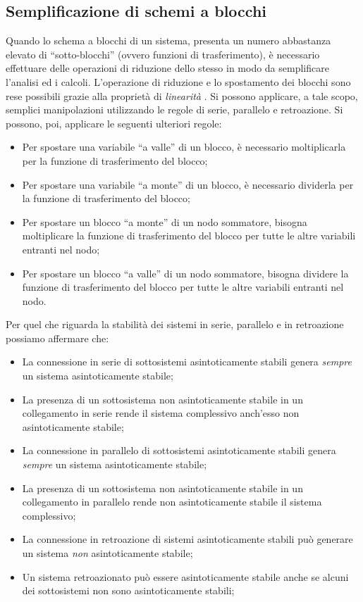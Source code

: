 \documentclass[a4paper]{report}
\begin{document}
\subsection{Semplificazione di schemi a blocchi}
Quando lo schema a blocchi  di un sistema, presenta un numero
abbastanza elevato di ``sotto-blocchi'' (ovvero funzioni di
trasferimento), \`e necessario effettuare delle operazioni di riduzione
dello stesso in modo da semplificare l'analisi ed i calcoli. L'operazione
di riduzione e lo spostamento dei blocchi sono rese possibili grazie
alla propriet\`a di \emph{linearit\`a }. Si possono applicare, a tale
scopo, semplici manipolazioni utilizzando le regole di serie,
parallelo e retroazione. Si possono, poi, applicare le seguenti
ulteriori regole: 
\begin{itemize}
\item Per spostare una variabile ``a valle'' di un blocco, \`e necessario
  moltiplicarla per la funzione di trasferimento del blocco;
\item Per spostare una variabile ``a monte'' di un blocco, \`e necessario
  dividerla per la funzione di trasferimento del blocco;
\item Per spostare un blocco ``a monte'' di un nodo sommatore, bisogna
  moltiplicare la funzione di trasferimento del blocco per tutte le
  altre variabili entranti nel nodo;
\item Per spostare un blocco ``a valle'' di un nodo sommatore, bisogna
  dividere la funzione di trasferimento del blocco per tutte le altre
  variabili entranti nel nodo.
\end{itemize}
Per quel che riguarda la stabilit\`a dei sistemi in serie, parallelo e
in retroazione possiamo affermare che:
\begin{itemize}
\item La connessione in serie di sottosistemi asintoticamente stabili
  genera {\em sempre} un sistema asintoticamente stabile;
\item La presenza di un sottosistema non asintoticamente stabile in un
  collegamento in serie rende il sistema complessivo anch'esso non
  asintoticamente stabile;
\item La connessione in parallelo di sottosistemi asintoticamente
  stabili genera {\em sempre} un sistema asintoticamente stabile;
\item La presenza di un sottosistema non asintoticamente stabile in un
  collegamento in parallelo rende non asintoticamente stabile il
  sistema complessivo;
\item La connessione in retroazione di sistemi asintoticamente stabili
  pu\`o generare un sistema {\em non} asintoticamente stabile;
\item Un sistema retroazionato pu\`o essere asintoticamente stabile
  anche se alcuni dei sottosistemi non sono asintoticamente stabili;
\end{itemize}
\end{document}
